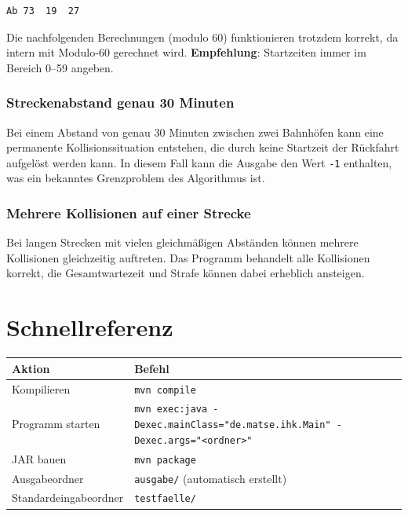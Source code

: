 \documentclass[12pt,a4paper]{article}
\begin{document}
\begin{lstlisting}
Ab 73  19  27
\end{lstlisting}

Die nachfolgenden Berechnungen (modulo 60) funktionieren trotzdem korrekt, da intern mit Modulo-60 gerechnet wird. \textbf{Empfehlung}: Startzeiten immer im Bereich 0--59 angeben.

\subsubsection{Streckenabstand genau 30 Minuten}

Bei einem Abstand von genau 30 Minuten zwischen zwei Bahnhöfen kann eine permanente Kollisionssituation entstehen, die durch keine Startzeit der Rückfahrt aufgelöst werden kann. In diesem Fall kann die Ausgabe den Wert \texttt{-1} enthalten, was ein bekanntes Grenzproblem des Algorithmus ist.

\subsubsection{Mehrere Kollisionen auf einer Strecke}

Bei langen Strecken mit vielen gleichmäßigen Abständen können mehrere Kollisionen gleichzeitig auftreten. Das Programm behandelt alle Kollisionen korrekt, die Gesamtwartezeit und Strafe können dabei erheblich ansteigen.

\section{Schnellreferenz}

\begin{center}
\begin{tabular}{ll}
\toprule
\textbf{Aktion} & \textbf{Befehl} \\
\midrule
Kompilieren & \texttt{mvn compile} \\
Programm starten & \texttt{mvn exec:java -Dexec.mainClass="de.matse.ihk.Main" -Dexec.args="<ordner>"} \\
JAR bauen & \texttt{mvn package} \\
Ausgabeordner & \texttt{ausgabe/} (automatisch erstellt) \\
Standardeingabeordner & \texttt{testfaelle/} \\
\bottomrule
\end{tabular}
\end{center}
\end{document}
